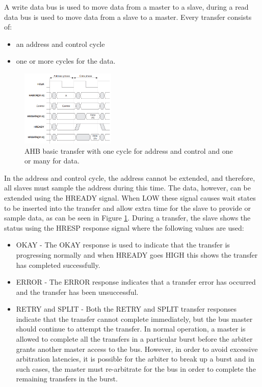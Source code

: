 A write data bus is used to move data from a master to a slave, during a read data bus
is used to move data from a slave to a master.
Every transfer consists of:

\begin{itemize}
\item an address and control cycle
\item one or more cycles for the data.
\end{itemize}

\begin{figure}[!ht]
    \centering
    \includegraphics[width=0.4\textwidth]{figures/others/simple_ahb_transfer.png}
    \caption{AHB basic transfer with one cycle for address and control and one or many for data.}
    \label{fig:basic_ahb_transfer}
\end{figure}


In the address and control cycle, the address cannot be extended, and therefore, all slaves must sample the address during this time. The data, however, can be extended using the HREADY signal. When LOW these signal causes wait states to be inserted into the transfer and allow extra time for the slave to provide or sample data, as can be seen in Figure \ref{fig:basic_ahb_transfer}. During a transfer, the slave shows the status using the HRESP response signal where the  following values are used:

\begin{itemize}

\item  {OKAY -} The OKAY response is used to indicate that the transfer is progressing normally and when HREADY goes HIGH this shows the transfer has completed successfully.
\item {ERROR -} The ERROR response indicates that a transfer error has occurred and the transfer has been unsuccessful.
\item {RETRY and SPLIT  -} Both the RETRY and SPLIT transfer responses indicate that the transfer cannot complete immediately, but the bus master should continue to attempt the transfer. In normal operation, a master is allowed to complete all the transfers in a particular burst before the arbiter grants another master access to the bus. However, in order to avoid excessive arbitration latencies, it is possible for the arbiter to break up a burst and in such cases, the master must re-arbitrate for the bus in order to complete the remaining transfers in the burst.
\end{itemize}



